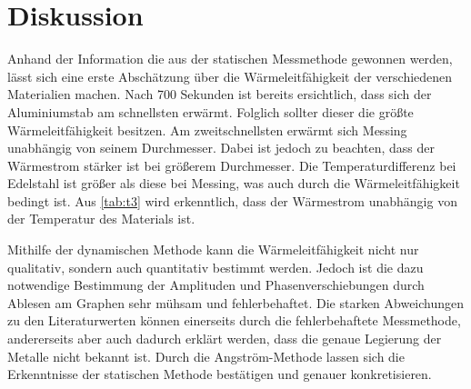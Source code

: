 \section{Diskussion}
\label{sec:Diskussion}
Anhand der Information die aus der statischen Messmethode gewonnen werden, lässt sich eine erste Abschätzung über die Wärmeleitfähigkeit der verschiedenen Materialien machen.
Nach 700 Sekunden ist bereits ersichtlich, dass sich der Aluminiumstab am schnellsten erwärmt.
Folglich sollter dieser die größte Wärmeleitfähigkeit besitzen.
Am zweitschnellsten erwärmt sich Messing unabhängig von seinem Durchmesser.
Dabei ist jedoch zu beachten, dass der Wärmestrom stärker ist bei größerem Durchmesser.
Die Temperaturdifferenz bei Edelstahl ist größer als diese bei Messing, was auch durch die Wärmeleitfähigkeit bedingt ist.
Aus \ref{tab:t3} wird erkenntlich, dass der Wärmestrom unabhängig von der Temperatur des Materials ist.

Mithilfe der dynamischen Methode kann die Wärmeleitfähigkeit nicht nur qualitativ, sondern auch quantitativ bestimmt werden.
Jedoch ist die dazu notwendige Bestimmung der Amplituden und Phasenverschiebungen durch Ablesen am Graphen sehr mühsam und fehlerbehaftet.
Die starken Abweichungen zu den Literaturwerten können einerseits durch die fehlerbehaftete 
Messmethode, andererseits aber auch dadurch erklärt werden, dass die genaue Legierung der 
Metalle nicht bekannt ist.
Durch die Angström-Methode lassen sich die Erkenntnisse der statischen Methode bestätigen und genauer konkretisieren.
